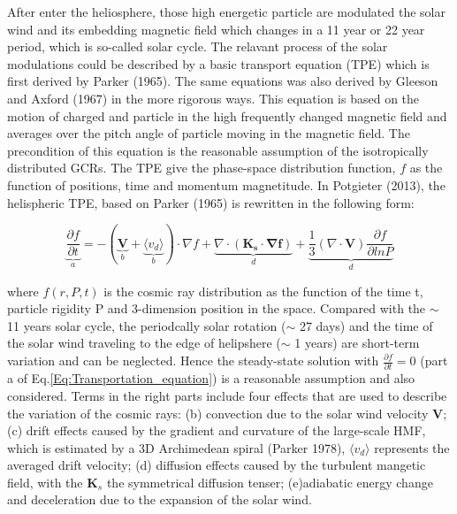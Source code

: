 
After enter the heliosphere, those high energetic particle are modulated the solar wind and its embedding magnetic field  which changes in a 11 year or 22 year period, which is so-called solar cycle.
The relavant process of the solar modulations could be described by a basic transport equation (TPE) which is first derived by Parker (1965). The same equations was also derived by Gleeson and Axford (1967) in the more rigorous ways. This equation is based on the motion of charged and particle in the high frequently changed magnetic field and averages over the pitch angle of particle moving in the magnetic field. The precondition of this equation is the reasonable assumption of the isotropically distributed GCRs. The TPE give the phase-space distribution function, $f$ as the function of positions, time and momentum magnetitude. In Potgieter (2013), the helispheric TPE, based on Parker (1965) is rewritten in the following form:

	\begin{equation}
		\underbrace{\frac{\partial f}{\partial t}}_{a} = - ( \underbrace{\boldsymbol{V}}_{b} + \underbrace{\langle v_d \rangle }_{b}) \cdot \nabla f + \underbrace{\nabla \cdot (\boldsymbol{K_s \cdot \nabla f})}_{d} + \underbrace{\frac{1}{3}(\nabla \cdot \boldsymbol{V}) \frac{\partial f}{\partial ln P}}_{d}
		\label{Eq:Transportation_equation}
	\end{equation}

where $f(r, P, t)$ is the cosmic ray distribution as the function of the time t, particle rigidity P and 3-dimension position in the space. Compared with the $\sim$ 11 years solar cycle, the periodcally solar rotation ($\sim$ 27 days) and  the time of the solar wind traveling to the edge of helipshere ($\sim$ 1 years) are short-term variation and can be neglected. Hence the steady-state solution with  $\frac{\partial f}{\partial t} = 0$ (part a of Eq.\ref{Eq:Transportation_equation}) is a reasonable assumption and also considered. Terms in the right parts include four effects that are used to describe the variation of the cosmic rays: (b) convection due to the solar wind velocity $\boldsymbol{V}$; (c) drift effects caused by the gradient and curvature of the large-scale \ac{HMF}, which is estimated by a 3D Archimedean spiral (Parker 1978), $\langle v_d \rangle$ represents the averaged drift velocity; (d) diffusion effects caused by the turbulent mangetic field, with the $\boldsymbol{K}_s$ the symmetrical diffusion tenser; (e)adiabatic energy change and deceleration due to the expansion of the solar wind. 

